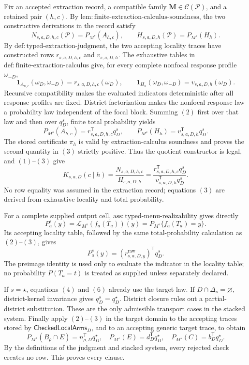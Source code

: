Fix an accepted extraction record, a compatible family \(\mathbf M\in\mathcal C(\mathcal P)\), and a retained pair \((h,c)\).  By \(\mathrm{lem:finite\text{-}extraction\text{-}calculus\text{-}soundness}\), the two constructive derivations in the record satisfy
\[
N_{s,a,D,h,c}(\mathcal P)=P_{M^s}(A_{h,c}),
\qquad
H_{s,a,D,h}(\mathcal P)=P_{M^s}(H_h).
\tag{1}
\]
By \(\mathrm{def:typed\text{-}extraction\text{-}judgment}\), the two accepting locality traces have constructed rows \(r_{s,a,D,h,c}\) and \(v_{s,a,D,h}\).  The exhaustive tables in \(\mathrm{def:finite\text{-}extraction\text{-}calculus}\) give, for every complete nonfocal response profile \(\omega_{-D}\),
\[
\mathbf 1_{A_{h,c}}(\omega_D,\omega_{-D})
=r_{s,a,D,h,c}(\omega_D),
\qquad
\mathbf 1_{H_h}(\omega_D,\omega_{-D})
=v_{s,a,D,h}(\omega_D).
\tag{2}
\]
Recursive compatibility makes the evaluated indicators deterministic after all response profiles are fixed.  District factorization makes the nonfocal response law a probability law independent of the focal block.  Summing \((2)\) first over that law and then over \(q_D^s\), finite total probability yields
\[
P_{M^s}(A_{h,c})=r_{s,a,D,h,c}^{\mathsf T}q_D^s,
\qquad
P_{M^s}(H_h)=v_{s,a,D,h}^{\mathsf T}q_D^s.
\tag{3}
\]
The stored certificate \(\pi_h\) is valid by extraction-calculus soundness and proves the second quantity in \((3)\) strictly positive.  Thus the quotient constructor is legal, and \((1)\)--\((3)\) give
\[
K_{s,a,D}(c\mid h)
=\frac{N_{s,a,D,h,c}}{H_{s,a,D,h}}
=\frac{r_{s,a,D,h,c}^{\mathsf T}q_D^s}
{v_{s,a,D,h}^{\mathsf T}q_D^s}.
\tag{4}
\]
No row equality was assumed in the extraction record; equations \((3)\) are derived from exhaustive locality and total probability.

For a complete supplied output cell, \(\mathrm{ass:typed\text{-}menu\text{-}realizability}\) gives directly
\[
P_a^s(y)=\mathcal L_{M^s}(f_a(T_a))(y)
=P_{M^s}\{f_a(T_a)=y\}.
\tag{5}
\]
Its accepting locality table, followed by the same total-probability calculation as \((2)\)--\((3)\), gives
\[
P_a^s(y)=(r^{\mathrm{raw}}_{s,a,D,y})^{\mathsf T}q_D^s.
\tag{6}
\]
The preimage identity is used only to evaluate the indicator in the locality table; no probability \(P(T_a=t)\) is treated as supplied unless separately declared.

If \(s=\star\), equations \((4)\) and \((6)\) already use the target law.  If \(D\cap\Delta_s=\varnothing\), district-kernel invariance gives \(q_D^s=q_D^\star\).  District closure rules out a partial-district substitution.  These are the only admissible transport cases in the stacked system.  Finally apply \((2)\)--\((3)\) in the target domain to the accepting traces stored by \(\mathsf{CheckedLocalArms}_D\), and to an accepting generic target trace, to obtain
\[
P_{M^\star}(B_\rho\cap E)=n_{\rho,D}^{\mathsf T}q_D^\star,
\quad
P_{M^\star}(E)=d_D^{\mathsf T}q_D^\star,
\quad
P_{M^\star}(C)=b_D^{\mathsf T}q_D^\star.
\tag{7}
\]
By the definitions of the judgment and stacked system, every rejected check creates no row.  This proves every clause.